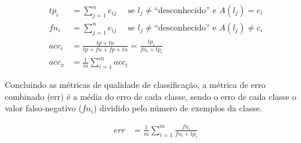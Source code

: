   \begin{align}
    tp_i            &= \sum_{j=1}^{n} e_{ij}        \quad \text{ se } l_j \neq \text{``desconhecido''} \text{ e } A(l_j) = c_i \label{eq:tpi}\\
    fn_i            &= \sum_{j=1}^{n} e_{ij}        \quad \text{ se } l_j \neq \text{``desconhecido''} \text{ e } A(l_j) \neq c_i \label{eq:fni}\\
    \mathit{acc}_i  &= \frac{tp + tn}{tp+fn+fp+tn}  = \frac{tp_i}{fn_i + tp_i} \label{eq:acci}\\
    \mathit{acc}_x & = \frac{1}{m} \sum_{i=1}^{m} \mathit{acc}_{i} \label{eq:acc}
  \end{align}

Concluindo as métricas de qualidade de classificação, a métrica de erro
combinado (err) é a média do erro de cada classe, sendo o erro de cada classe
o valor falso-negativo ($fn_i$) dividido pelo número de exemplos da classe.

\begin{align}
\mathit{err} &= \frac{1}{m} \sum_{i=1}^{m} \frac{fn_i}{fn_i + tp_i}
\end{align}




